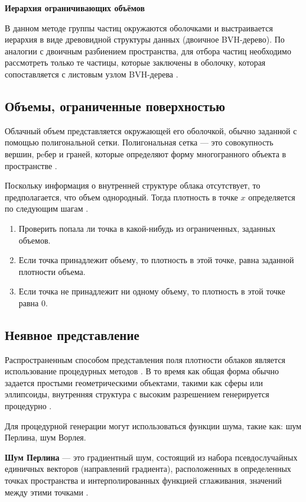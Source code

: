 \textbf{Иерархия ограничивающих объёмов}

В данном методе группы частиц окружаются оболочками и выстраивается иерархия в виде древовидной структуры данных (двоичное BVH-дерево). По аналогии с двоичным разбиением пространства, для отбора частиц необходимо рассмотреть только те частицы, которые заключены в оболочку, которая сопоставляется с листовым узлом BVH-дерева \cite{clouds}.


\subsection{Объемы, ограниченные поверхностью} 
Облачный объем представляется окружающей его оболочкой, обычно заданной с помощью полигональной сетки. Полигональная сетка --- это совокупность вершин, рeбер и граней, которые определяют форму многогранного объекта в пространстве \cite{mesh}.

Поскольку информация о внутренней структуре облака отсутствует, то предполагается, что объем однородный. Тогда плотность в точке $x$ определяется по следующим шагам \cite{clouds}. 
\begin{enumerate}
	\item Проверить попала ли точка в какой-нибудь из ограниченных, заданных объемов.
	\item Если точка принадлежит объему, то плотность в этой точке, равна заданной плотности объема.
	\item Если точка не принадлежит ни одному объему, то плотность в этой точке равна 0.
\end{enumerate}

\subsection{Неявное представление} 
\label{implicit}
Распространенным способом представления поля плотности облаков является использование процедурных методов \cite{frostbite, hzd}. В то время как общая форма обычно задается простыми геометрическими объектами, такими как сферы или эллипсоиды, внутренняя структура с высоким разрешением генерируется процедурно \cite{clouds}. 

Для процедурной генерации могут использоваться функции шума, такие как: шум Перлина, шум Ворлея. 

\textbf{Шум Перлина} --- это градиентный шум, состоящий из набора псевдослучайных единичных векторов (направлений градиента), расположенных в определенных точках пространства и интерполированных функцией сглаживания, значений между этими точками \cite{perlin}.

